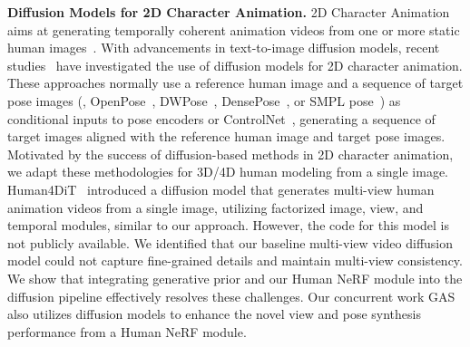 \noindent \textbf{Diffusion Models for 2D Character Animation.}
2D Character Animation aims at generating temporally coherent animation videos from one or more static human images~\cite{albahar2023single, cao2024dreamavatar, chan2019everybody, fu2022stylegan, jiang2023humangen, prokudin2021smplpix, ren2020deep, sarkar2020neural, Siarohin_2019_NeurIPS, siarohin2021motion, yoon2021pose, yu2023bidirectionally, zhang2022exploring, zhao2022thin}.
With advancements in text-to-image diffusion models, recent studies~\cite{bhunia2023person, karras2023dreampose, wang2023disco, chang2023magicpose, xu2024magicanimate, hu2024animate, zhu2024champ, zhang2024mimicmotion, kim2024tcan, liyuan2024cfsynthesis} have investigated the use of diffusion models for 2D character animation.
These approaches normally use a reference human image and a sequence of target pose images (\eg, OpenPose~\cite{8765346}, DWPose~\cite{yang2023effective}, DensePose~\cite{guler2018densepose}, or SMPL pose~\cite{SMPL:2015}) as conditional inputs to pose encoders or ControlNet~\cite{zhang2023adding}, generating a sequence of target images aligned with the reference human image and target pose images.
Motivated by the success of diffusion-based methods in 2D character animation, we adapt these methodologies for 3D/4D human modeling from a single image. Human4DiT~\cite{shao2024360} introduced a diffusion model that generates multi-view human animation videos from a single image, utilizing factorized image, view, and temporal modules, similar to our approach. However, the code for this model is not publicly available. We identified that our baseline multi-view video diffusion model could not capture fine-grained details and maintain multi-view consistency. 
We show that integrating generative prior and our Human NeRF module into the diffusion pipeline effectively resolves these challenges.
Our concurrent work GAS~\cite{lu2025gas} also utilizes diffusion models to enhance the novel view and pose synthesis performance from a Human NeRF module.
